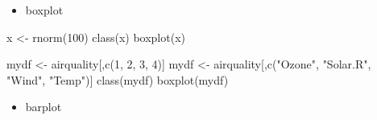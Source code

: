 \documentclass[
]{book}
\newenvironment{Shaded}{\begin{snugshade}}{\end{snugshade}}
\newcommand{\DecValTok}[1]{\textcolor[rgb]{0.00,0.00,0.81}{#1}}
\newcommand{\FunctionTok}[1]{\textcolor[rgb]{0.00,0.00,0.00}{#1}}
\newcommand{\NormalTok}[1]{#1}
\newcommand{\OtherTok}[1]{\textcolor[rgb]{0.56,0.35,0.01}{#1}}
\newcommand{\StringTok}[1]{\textcolor[rgb]{0.31,0.60,0.02}{#1}}
\providecommand{\tightlist}{%
  \setlength{\itemsep}{0pt}\setlength{\parskip}{0pt}}
\begin{document}
\begin{itemize}
\tightlist
\item
  boxplot
\end{itemize}

\begin{Shaded}
\begin{Highlighting}[]
\NormalTok{x }\OtherTok{\textless{}{-}} \FunctionTok{rnorm}\NormalTok{(}\DecValTok{100}\NormalTok{)}
\FunctionTok{class}\NormalTok{(x)}
\FunctionTok{boxplot}\NormalTok{(x)}


\NormalTok{mydf }\OtherTok{\textless{}{-}}\NormalTok{ airquality[,}\FunctionTok{c}\NormalTok{(}\DecValTok{1}\NormalTok{, }\DecValTok{2}\NormalTok{, }\DecValTok{3}\NormalTok{, }\DecValTok{4}\NormalTok{)]}
\NormalTok{mydf }\OtherTok{\textless{}{-}}\NormalTok{ airquality[,}\FunctionTok{c}\NormalTok{(}\StringTok{"Ozone"}\NormalTok{, }\StringTok{"Solar.R"}\NormalTok{, }\StringTok{"Wind"}\NormalTok{, }\StringTok{"Temp"}\NormalTok{)]}
\FunctionTok{class}\NormalTok{(mydf)}
\FunctionTok{boxplot}\NormalTok{(mydf)}
\end{Highlighting}
\end{Shaded}

\begin{itemize}
\tightlist
\item
  barplot
\end{itemize}
\end{document}
